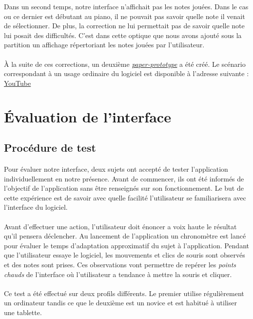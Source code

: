\documentclass[a4paper, 12pt]{article}
\begin{document}
    Dans un second temps, notre interface n'affichait pas les notes jouées. Dans le cas ou ce dernier est débutant au piano, il ne pouvait pas savoir quelle note il venait de sélectionner. De plus, la correction ne lui permettait pas de savoir quelle note lui posait des difficultés. C'est dans cette optique que nous avons ajouté sous la partition un affichage répertoriant les notes jouées par l'utilisateur.
    
    \paragraph{}
    À la suite de ces corrections, un deuxième \href{https://youtu.be/iWcTD7AGAPs}{\emph{paper-prototype}} a été créé. Le scénario correspondant à un usage ordinaire du logiciel est disponible à l'adresse suivante : \href{https://youtu.be/iWcTD7AGAPs}{YouTube}

\section{Évaluation de l'interface}
    \subsection{Procédure de test}
    \paragraph{}
    Pour évaluer notre interface, deux sujets ont accepté de tester l'application individuellement en notre présence. Avant de commencer, ils ont été informés de l'objectif de l'application sans être renseignés sur son fonctionnement. Le but de cette expérience est de savoir avec quelle facilité l'utilisateur se familiarisera avec l'interface du logiciel.
    \paragraph{}
    Avant d'effectuer une action, l'utilisateur doit énoncer a voix haute le résultat qu'il pensera déclencher. Au lancement de l'application un chronomètre est lancé pour évaluer le temps d'adaptation approximatif du sujet à l'application. Pendant que l'utilisateur essaye le logiciel, les mouvements et clics de souris sont observés et des notes sont prises. Ces observations vont permettre de repérer les \emph{points chauds} de l'interface où l'utilisateur a tendance à mettre la souris et cliquer.
    \paragraph{}
    Ce test a été effectué sur deux profils différents. Le premier utilise régulièrement un ordinateur tandis ce que le deuxième est un novice et est habitué à utiliser une tablette.
\end{document}
